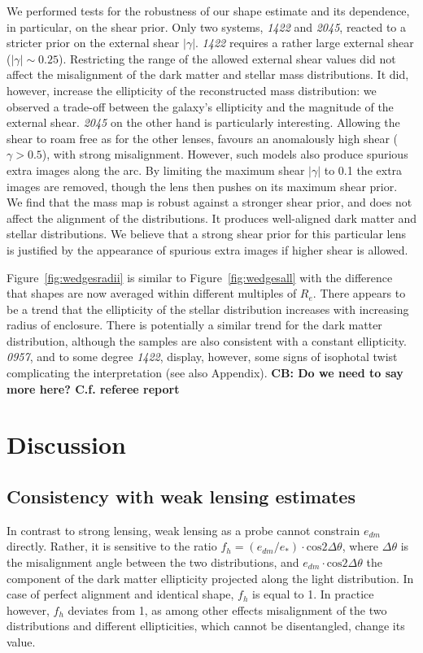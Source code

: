\documentclass[useAMS,usenatbib]{mn2e}
\begin{document}
We performed tests for the robustness of our shape estimate and its dependence, in particular, on the shear prior. Only two systems, {\it1422} and {\it2045}, reacted to a stricter prior on the external shear $|\gamma|$. {\it1422} requires a rather large external shear ($|\gamma|\sim0.25$). Restricting the range of the allowed external shear values did not affect the misalignment of the dark matter and stellar mass distributions. It did, however, increase the ellipticity of the reconstructed mass distribution: we observed a trade-off between the galaxy's ellipticity and the magnitude of the external shear. {\it2045} on the other hand is particularly interesting. Allowing the shear to roam free as for the other lenses, favours an anomalously high shear ($\gamma > 0.5$), with strong misalignment. However, such models also produce spurious extra images along the arc. By limiting the maximum shear $|\gamma|$ to 0.1 the extra images are removed, though the lens then pushes on its maximum shear prior. We find that the mass map is robust against a stronger shear prior, and does not affect the alignment of the distributions. It produces well-aligned dark matter and stellar distributions. We believe that a strong shear prior for this particular lens is justified by the appearance of spurious extra images if higher shear is allowed.

Figure~\ref{fig:wedgesradii} is similar to Figure~\ref{fig:wedgesall} with the difference that shapes are now averaged within different multiples of $R_e$. There appears to be a trend that the ellipticity of the stellar distribution increases with increasing radius of enclosure. There is potentially a similar trend for the dark matter distribution, although the samples are also consistent with a constant ellipticity. {\it0957}, and to some degree {\it1422}, display, however, some signs of isophotal twist complicating the interpretation (see also Appendix).
\textbf{CB: Do we need to say more here? C.f. referee report}

\section{Discussion}\label{sec:discussion}

\subsection{Consistency with weak lensing estimates}
In contrast to strong lensing, weak lensing as a probe cannot constrain $e_{dm}$ directly. Rather, it is sensitive to the ratio $f_{h} = (e_{dm}/e_{*})\cdot\mathrm{cos} 2\Delta\theta$, where $\Delta\theta$ is the misalignment angle between the two distributions, and $e_{dm}\cdot\mathrm{cos} 2\Delta\theta$ the component of the dark matter ellipticity projected along the light distribution. In case of perfect alignment and identical shape, $f_{h}$ is equal to 1. In practice however, $f_{h}$ deviates from 1, as among other effects misalignment of the two distributions and different ellipticities, which cannot be disentangled, change its value.
\end{document}
